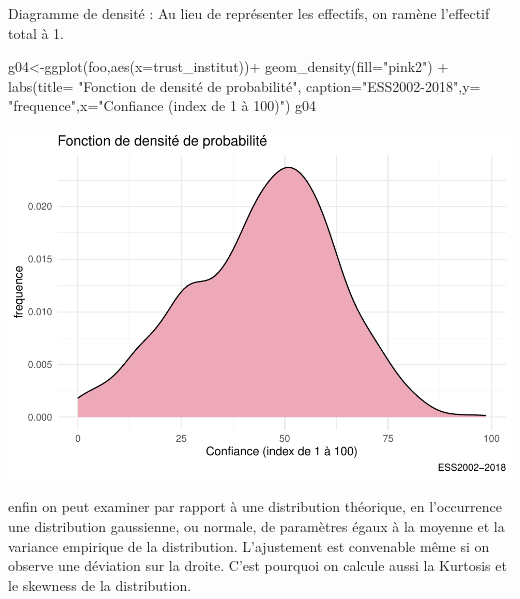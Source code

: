 \documentclass[
]{book}
\newenvironment{Shaded}{\begin{snugshade}}{\end{snugshade}}
\newcommand{\AttributeTok}[1]{\textcolor[rgb]{0.77,0.63,0.00}{#1}}
\newcommand{\FunctionTok}[1]{\textcolor[rgb]{0.00,0.00,0.00}{#1}}
\newcommand{\NormalTok}[1]{#1}
\newcommand{\OtherTok}[1]{\textcolor[rgb]{0.56,0.35,0.01}{#1}}
\newcommand{\SpecialCharTok}[1]{\textcolor[rgb]{0.00,0.00,0.00}{#1}}
\newcommand{\StringTok}[1]{\textcolor[rgb]{0.31,0.60,0.02}{#1}}
\begin{document}
Diagramme de densité : Au lieu de représenter les effectifs, on ramène l'effectif total à 1.

\begin{Shaded}
\begin{Highlighting}[]
\NormalTok{g04}\OtherTok{\textless{}{-}}\FunctionTok{ggplot}\NormalTok{(foo,}\FunctionTok{aes}\NormalTok{(}\AttributeTok{x=}\NormalTok{trust\_institut))}\SpecialCharTok{+} 
  \FunctionTok{geom\_density}\NormalTok{(}\AttributeTok{fill=}\StringTok{"pink2"}\NormalTok{) }\SpecialCharTok{+}
  \FunctionTok{labs}\NormalTok{(}\AttributeTok{title=} \StringTok{"Fonction de densité de probabilité"}\NormalTok{, }\AttributeTok{caption=}\StringTok{"ESS2002{-}2018"}\NormalTok{,}\AttributeTok{y=} \StringTok{"frequence"}\NormalTok{,}\AttributeTok{x=}\StringTok{"Confiance (index de 1 à 100)"}\NormalTok{) }
\NormalTok{g04}
\end{Highlighting}
\end{Shaded}

\includegraphics{bookdown-demo_files/figure-latex/304-1.pdf}

enfin on peut examiner par rapport à une distribution théorique, en l'occurrence une distribution gaussienne, ou normale, de paramètres égaux à la moyenne et la variance empirique de la distribution. L'ajustement est convenable même si on observe une déviation sur la droite. C'est pourquoi on calcule aussi la Kurtosis et le skewness de la distribution.
\end{document}

